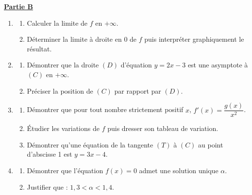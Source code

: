 \documentclass[12pt,a4paper]{article}
\begin{document}
\noindent \underline{\textbf{Partie B}}
\begin{enumerate}
    \item 
    \begin{enumerate}
        \item Calculer la limite de $f$ en $+\infty$.
        \item Déterminer la limite à droite en 0 de $f$ puis interpréter graphiquement le résultat.
    \end{enumerate}
    \item 
    \begin{enumerate}
        \item Démontrer que la droite $(D)$ d'équation $y = 2x - 3$ est une asymptote à $(C)$ en $+\infty$.
        \item Préciser la position de $(C)$ par rapport par $(D)$.
    \end{enumerate}
    \item 
    \begin{enumerate}
        \item Démontrer que pour tout nombre strictement positif $x$, $f'(x) = \dfrac{g(x)}{x^2}$.
        \item Étudier les variations de $f$ puis dresser son tableau de variation.
        \item Démontrer qu'une équation de la tangente $(T)$ à $(C)$ au point d'abscisse 1 est $y = 3x - 4$.
    \end{enumerate}
    \item 
    \begin{enumerate}
        \item Démontrer que l'équation $f(x) = 0$ admet une solution unique $\alpha$.
        \item Justifier que : $1,3 < \alpha < 1,4$.
    \end{enumerate}
\end{enumerate}

\vspace{0.5cm}
\end{document}
